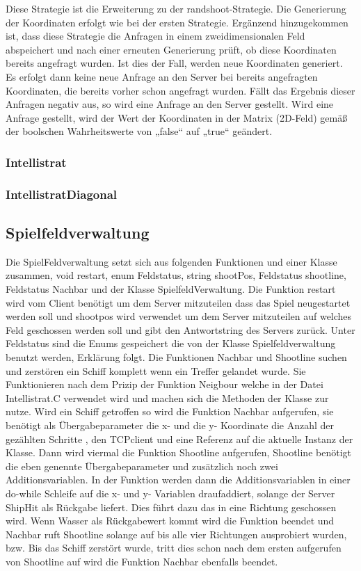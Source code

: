 Diese Strategie ist die Erweiterung zu der randshoot-Strategie. Die Generierung der
Koordinaten erfolgt wie bei der ersten Strategie. Ergänzend hinzugekommen ist, dass
diese Strategie die Anfragen in einem zweidimensionalen Feld abspeichert und nach
einer erneuten Generierung prüft, ob diese Koordinaten bereits angefragt wurden. Ist
dies der Fall, werden neue Koordinaten generiert. Es erfolgt dann keine neue Anfrage an
den Server bei bereits angefragten Koordinaten, die bereits vorher schon angefragt
wurden. Fällt das Ergebnis dieser Anfragen negativ aus, so wird eine Anfrage an den
Server gestellt. Wird eine Anfrage gestellt, wird der Wert der Koordinaten in der Matrix
(2D-Feld) gemäß der boolschen Wahrheitswerte von „false“ auf „true“ geändert.

\subsubsection*{Intellistrat}

\subsubsection*{IntellistratDiagonal}

\subsection*{Spielfeldverwaltung}

Die SpielFeldverwaltung setzt sich aus folgenden Funktionen und einer Klasse zusammen,
void restart, enum Feldstatus, string shootPos, Feldstatus shootline, Feldstatus Nachbar und der Klasse SpielfeldVerwaltung.
Die Funktion restart wird vom Client benötigt um dem Server mitzuteilen dass das Spiel neugestartet werden soll und shootpos wird verwendet um dem Server mitzuteilen auf welches Feld geschossen werden soll und gibt den Antwortstring des Servers zurück. Unter Feldstatus sind die Enums gespeichert die von der Klasse Spielfeldverwaltung benutzt werden, Erklärung folgt. Die Funktionen Nachbar und Shootline suchen und zerstören ein Schiff komplett wenn ein Treffer gelandet wurde. Sie Funktionieren nach dem Prizip der Funktion Neigbour welche in der Datei Intellistrat.C verwendet wird und machen sich die Methoden der Klasse zur nutze. Wird ein Schiff getroffen so wird die Funktion Nachbar aufgerufen, sie benötigt als Übergabeparameter die x- und die y- Koordinate die Anzahl der gezählten Schritte , den TCPclient und eine Referenz auf die aktuelle Instanz der Klasse. Dann wird viermal die Funktion Shootline aufgerufen, Shootline benötigt die eben genennte Übergabeparameter und zusätzlich noch zwei Additionsvariablen. In der Funktion werden dann die Additionsvariablen in einer do-while Schleife auf die x- und y- Variablen draufaddiert, solange der Server ShipHit als Rückgabe liefert. Dies führt dazu das in eine Richtung geschossen wird. Wenn Wasser als Rückgabewert kommt wird die Funktion beendet und Nachbar ruft Shootline solange auf bis alle vier Richtungen ausprobiert wurden, bzw. Bis das Schiff zerstört wurde, tritt dies schon nach dem ersten aufgerufen von Shootline auf wird die Funktion Nachbar ebenfalls beendet.

